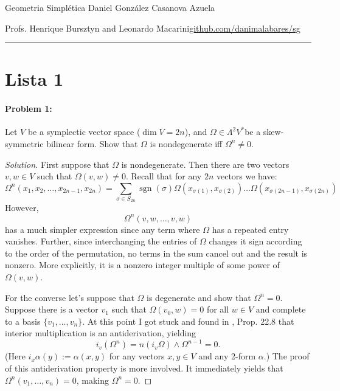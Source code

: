 


\begin{minipage}{\textwidth}
	\begin{minipage}{1\textwidth}
		Geometria Simpl\'etica \hfill Daniel González Casanova Azuela
		
		{\small Profs. Henrique Bursztyn and Leonardo Macarini\hfill\href{https://github.com/danimalabares/sg}{github.com/danimalabares/sg}}
	\end{minipage}
\end{minipage}\vspace{.2cm}\hrule

\vspace{10pt}
\section{Lista 1}

\paragraph{Problem 1:} Let $V$ be a symplectic vector space ($\dim V=2n$), and $\Omega\in \Lambda^{2} V^{*}$be a skew-symmetric bilinear form. Show that $\Omega$ is nondegenerate iff $\Omega^{n} \neq 0$.

\begin{proof}[Solution]
	First suppose that $\Omega$ is nondegenerate. Then there are two vectors  $v,w\in V$ such that $\Omega(v,w)\neq 0$. Recall that for any $2n$ vectors we have:
	\[\Omega^n(x_1,x_2,\ldots,x_{2n-1},x_{2n})=\sum_{\sigma\in S_{2n}}\operatorname{sgn}(\sigma)\Omega(x_{\sigma(1)},x_{\sigma(2)})\ldots\Omega(x_{\sigma(2n-1)},x_{\sigma(2n)})\]
However,
	\[\Omega^n(v,w,\ldots,v,w)\]
has a much simpler expression since any term where $\Omega$ has a repeated entry vanishes. Further, since interchanging the entries of $\Omega$ changes it sign according to the order of the permutation, no terms in the sum cancel out and the result is nonzero. More explicitly, it is a nonzero integer multiple of some power of $\Omega(v,w)$.

	For the converse let's suppose that $\Omega$ is degenerate and show that $\Omega^{n}=0$. Suppose there is a vector $v_1$ such that $\Omega( v_0,w)=0$ for all $w\in V$ and complete to a basis $\{v_1,\ldots,v_n\}$. At this point I got stuck and found in \cite{lee}, Prop. 22.8 that interior multiplication is an antiderivation, yielding
	\[i_v(\Omega^n)=n(i_v\Omega)\wedge \Omega^{n-1}=0.\]
	(Here $i_x\alpha(y):=\alpha(x,y)$ for any vectors $x,y\in V$ and any 2-form $\alpha$.) The proof of this antiderivation property is more involved. It immediately yields that $\Omega^n(v_1,\ldots,v_n)=0$, making $\Omega^n=0$.

\end{proof}

